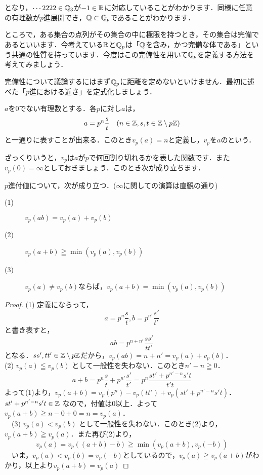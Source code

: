 \documentclass[./main]{subfiles}
\begin{document}
となり，$\cdots 2222\in \mathbb{Q}_3$が$-1\in\mathbb{R}$に対応していることがわかります．同様に任意の有理数が$p$進展開でき，$\mathbb{Q} \subset \mathbb{Q}_p$であることがわかります．

ところで，ある集合の点列がその集合の中に極限を持つとき，その集合は完備であるといいます．今考えている$\mathbb{R}$と$\mathbb{Q}_p$は「$\mathbb{Q}$を含み，かつ完備な体である」という共通の性質を持っています．今度はこの完備性を用いて$\mathbb{Q}_p$を定義する方法を考えてみましょう．


完備性について議論するにはまず$\mathbb{Q}_p$に距離を定めないといけません．最初に述べた「$p$進における近さ」を定式化しましょう．

\begin{defi}
$a$を0でない有理数とする．各$p$に対し$a$は，
\[
a=p^n \frac{s}{t} \quad (n\in \mathbb{Z}, s,t \in \mathbb{Z} \setminus p\mathbb{Z} )
\]
と一通りに表すことが出来る．このとき$v_p(a)=n$と定義し，$v_p$を$a$のという．
\end{defi}

ざっくりいうと，$v_p$は$a$が$p$で何回割り切れるかを表した関数です．また$v_p(0)=\infty$としておきましょう．このとき次が成り立ちます．

\begin{prop}
$p$進付値について，次が成り立つ．($\infty$に関しての演算は直観の通り)
\begin{description}
	\item[(1)] $v_p(ab)=v_p(a)+v_p(b)$
	\item[(2)] $v_p(a+b) \geqq \min(v_p(a),v_p(b))$
	\item[(3)] $v_p(a) \neq v_p(b)$ならば，$v_p(a+b)=\min(v_p(a),v_p(b))$
\end{description}
\end{prop}

\begin{proof}
	(1) 定義にならって，
	\[
	a=p^n \frac{s}{t},b=p^{n'} \frac{s'}{t'}
	\]
	と書き表すと，
	\[
	ab=p^{n+n'}\frac{ss'}{tt'}
	\]
	となる．$ss',tt' \in \mathbb{Z} \setminus p\mathbb{Z}$だから，$v_p(ab)=n+n'=v_p(a)+v_p(b)$． \\
	(2) $v_p(a) \leqq v_p(b)$ として一般性を失わない．このとき$n'-n \geqq 0$．
　\[
　a+b=p^n \frac{s}{t} + p^{n'} \frac{s'}{t'} = p^n\frac{st'+p^{n'-n}s't}{t't}
　\]
	よって(1)より，$v_p(a+b) = v_p(p^n) - v_p(tt') + v_p(st'+p^{n'-n}s't)$．$st'+p^{n'-n}s't \in \mathbb{Z}$ なので，付値は0以上．よって$v_p(a+b) \geqq n-0+0 =n= v_p(a)$．\\
　(3) $v_p(a) < v_p(b)$ として一般性を失わない．このとき(2)より，$v_p(a+b) \geqq v_p(a)$．また再び(2)より，
　\[
　v_p(a)=v_p((a+b)-b) \geqq \min(v_p(a+b),v_p(-b))
　\]
　いま，$v_p(a) < v_p(b)=v_p(-b)$としているので，$v_p(a) \geqq v_p(a+b)$がわかり，以上より$v_p(a+b)=v_p(a)$
\end{proof}
\end{document}
